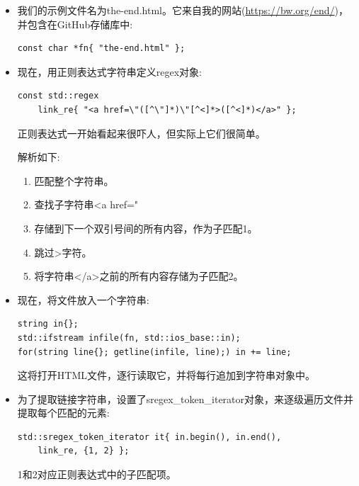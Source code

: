 \begin{itemize}
\item 
我们的示例文件名为the-end.html。它来自我的网站(\url{https://bw.org/end/})，并包含在GitHub存储库中:

\begin{lstlisting}[style=styleCXX]
const char *fn{ "the-end.html" };
\end{lstlisting}

\item 
现在，用正则表达式字符串定义regex对象:

\begin{lstlisting}[style=styleCXX]
const std::regex
	link_re{ "<a href=\"([^\"]*)\"[^<]*>([^<]*)</a>" };
\end{lstlisting}

正则表达式一开始看起来很吓人，但实际上它们很简单。

解析如下:

\begin{enumerate}[label=\Roman*.]
\item 
匹配整个字符串。

\item 
查找子字符串<a href="

\item 
存储到下一个双引号间的所有内容，作为子匹配1。

\item 
跳过>字符。

\item 
将字符串</a>之前的所有内容存储为子匹配2。
\end{enumerate}

\item 
现在，将文件放入一个字符串:

\begin{lstlisting}[style=styleCXX]
string in{};
std::ifstream infile(fn, std::ios_base::in);
for(string line{}; getline(infile, line);) in += line;
\end{lstlisting}

这将打开HTML文件，逐行读取它，并将每行追加到字符串对象中。

\item 
为了提取链接字符串，设置了sregex\_token\_iterator对象，来逐级遍历文件并提取每个匹配的元素:

\begin{lstlisting}[style=styleCXX]
std::sregex_token_iterator it{ in.begin(), in.end(),
	link_re, {1, 2} };
\end{lstlisting}

1和2对应正则表达式中的子匹配项。


\end{itemize}
